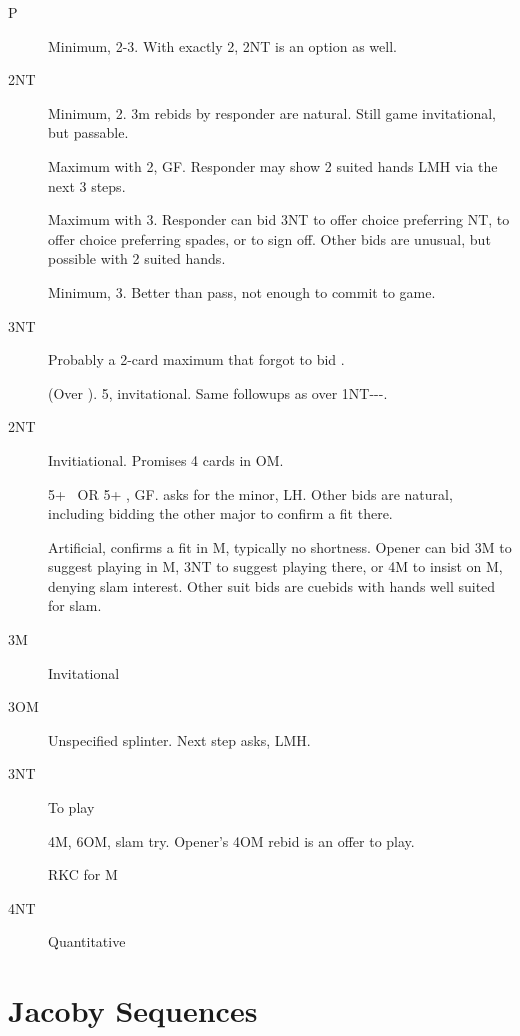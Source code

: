 \documentclass[tom-ari]{subfiles}
\begin{document}
\begin{description}
  \item[P] Minimum, 2-3\spadesuit. With exactly 2, 2NT is an option as well.
  \item[2NT] Minimum, 2\spadesuit. 3m rebids by responder are natural. Still game invitational, but passable.
  \item[] Maximum with 2\spadesuit, GF. Responder may show 2 suited hands LMH via the next 3 steps.
  \item[] Maximum with 3\spadesuit. Responder can bid 3NT to offer choice preferring NT,  to offer choice preferring spades, or  to sign off.
              Other bids are unusual, but possible with 2 suited hands.
  \item[] Minimum, 3\spadesuit. Better than pass, not enough to commit to game.
  \item[3NT] Probably a 2-card maximum that forgot to bid .
\end{description}

\begin{description}
  \item[] (Over ). 5\spadesuit, invitational. Same followups as over 1NT---.
  \item[2NT] Invitiational. Promises 4 cards in OM.
  \item[] 5+ \clubsuit ~OR 5+ \diamondsuit, GF.  asks for the minor, LH. Other bids are natural, including bidding the other major to confirm a fit there.
  \item[] Artificial, confirms a fit in M, typically no shortness. Opener can bid 3M to suggest playing in M, 3NT to suggest playing there, or 4M to insist on M, denying slam interest. Other suit bids are cuebids with hands well suited for slam.
  \item[3M] Invitational
  \item[3OM] Unspecified splinter. Next step asks, LMH.
  \item[3NT] To play
  \item[] 4M, 6OM, slam try. Opener's 4OM rebid is an offer to play.
  \item[] RKC for M
  \item[4NT] Quantitative
\end{description}

\section{Jacoby Sequences}
\end{document}
